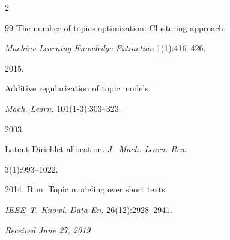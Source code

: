 \begin{multicols}{2}
{{\begin{thebibliography}{99}
The number of topics optimization: Clustering approach. 


\textit{Machine Learning Knowledge Extraction} 1(1):416--426.




 2015. 


Additive regularization of topic models. 


\textit{Mach. Learn.} 101(1-3):303--323.


{





}







 2003. 


Latent Dirichlet allocation. \textit{J.~Mach. Learn. Res.}


 3(1):993--1022.


 {


 


 }


 






 2014. Btm: Topic modeling over short texts. 


 \textit{IEEE~T. Knowl. Data En.} 26(12):2928--2941.


 \end{thebibliography}





 }


 }





\end{multicols}





\vspace*{-6pt}





\hfill{\small\textit{Received June 27, 2019}}










